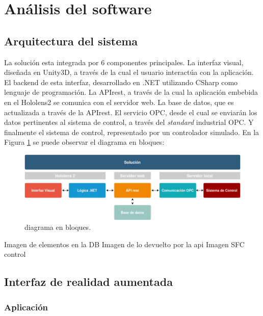 \section{Análisis del software}

\subsection{Arquitectura del sistema}
La solución esta integrada por 6 componentes principales. La interfaz visual, diseñada en Unity3D, a través de la cual el usuario interactúa con la aplicación. El backend de esta interfaz, desarrollado en .NET utilizando CSharp como lenguaje de programación. La APIrest, a través de la cual la aplicación embebida en el Hololens2 se comunica con el servidor web. La base de datos, que es actualizada a través de la APIrest. El servicio OPC, desde el cual se enviarán los datos pertinentes al sistema de control, a través del \textit{standard} industrial OPC. Y finalmente el sistema de control, representado por un controlador simulado. En la Figura \ref{fig:Diag_bloques} se puede observar el diagrama en bloques:

\begin{figure}[htpb]
	\centering
	\includegraphics[scale=.5]{./Figures/Diag_bloques.jpg}
	\caption{diagrama en bloques\protect\footnotemark.}
	\label{fig:Diag_bloques}
\end{figure}

Imagen de elementos en la DB
Imagen de lo devuelto por la api
Imagen SFC control

\subsection{Interfaz de realidad aumentada}
\subsubsection{Aplicación}

